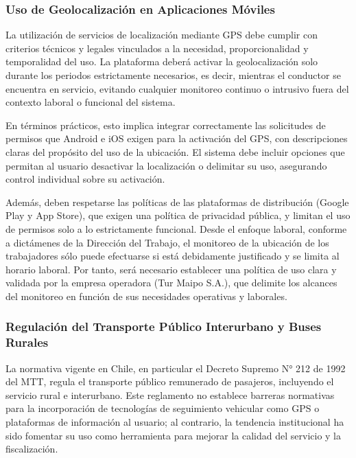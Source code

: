 \documentclass[12pt]{article}
\begin{document}
\newpage
\subsubsection{Uso de Geolocalización en Aplicaciones Móviles}

La utilización de servicios de localización mediante GPS debe cumplir con criterios técnicos y legales vinculados a la necesidad, proporcionalidad y temporalidad del uso. La plataforma deberá activar la geolocalización solo durante los periodos estrictamente necesarios, es decir, mientras el conductor se encuentra en servicio, evitando cualquier monitoreo continuo o intrusivo fuera del contexto laboral o funcional del sistema.

En términos prácticos, esto implica integrar correctamente las solicitudes de permisos que Android e iOS exigen para la activación del GPS, con descripciones claras del propósito del uso de la ubicación. El sistema debe incluir opciones que permitan al usuario desactivar la localización o delimitar su uso, asegurando control individual sobre su activación.

Además, deben respetarse las políticas de las plataformas de distribución (Google Play y App Store), que exigen una política de privacidad pública, y limitan el uso de permisos solo a lo estrictamente funcional. Desde el enfoque laboral, conforme a dictámenes de la Dirección del Trabajo, el monitoreo de la ubicación de los trabajadores sólo puede efectuarse si está debidamente justificado y se limita al horario laboral. Por tanto, será necesario establecer una política de uso clara y validada por la empresa operadora (Tur Maipo S.A.), que delimite los alcances del monitoreo en función de sus necesidades operativas y laborales.\\

\subsubsection{Regulación del Transporte Público Interurbano y Buses Rurales}

La normativa vigente en Chile, en particular el Decreto Supremo N° 212 de 1992 del MTT, regula el transporte público remunerado de pasajeros, incluyendo el servicio rural e interurbano. Este reglamento no establece barreras normativas para la incorporación de tecnologías de seguimiento vehicular como GPS o plataformas de información al usuario; al contrario, la tendencia institucional ha sido fomentar su uso como herramienta para mejorar la calidad del servicio y la fiscalización.
\end{document}
